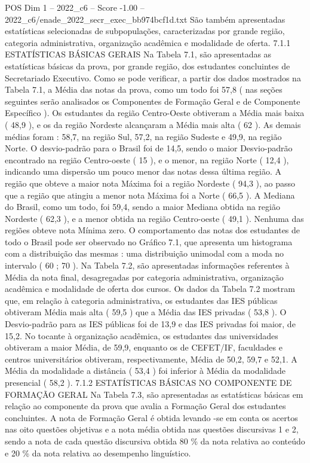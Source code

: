 \begin{textsample}{POS Dim 1 – 2022\_c6 – Score -1.00 – 2022\_c6/enade\_2022\_secr\_exec\_bb974bcf1d.txt}
São também apresentadas estatísticas selecionadas de subpopulações, caracterizadas por grande região, categoria administrativa, organização acadêmica e modalidade de oferta. 7.1.1 ESTATÍSTICAS BÁSICAS GERAIS Na Tabela 7.1, são apresentadas as estatísticas básicas da prova, por grande região, dos estudantes concluintes de Secretariado Executivo.
Como se pode verificar, a partir dos dados mostrados na Tabela 7.1, a Média das notas da prova, como um todo foi 57,8 ( nas seções seguintes serão analisados os Componentes de Formação Geral e de Componente Específico ).
Os estudantes da região Centro-Oeste obtiveram a Média mais baixa ( 48,9 ), e os da região Nordeste alcançaram a Média mais alta ( 62 ).
As demais médias foram : 58,7, na região Sul, 57,2, na região Sudeste e 49,9, na região Norte.
O desvio-padrão para o Brasil foi de 14,5, sendo o maior Desvio-padrão encontrado na região Centro-oeste ( 15 ), e o menor, na região Norte ( 12,4 ), indicando uma dispersão um pouco menor das notas dessa última região.
A região que obteve a maior nota Máxima foi a região Nordeste ( 94,3 ), ao passo que a região que atingiu a menor nota Máxima foi a Norte ( 66,5 ).
A Mediana do Brasil, como um todo, foi 59,4, sendo a maior Mediana obtida na região Nordeste ( 62,3 ), e a menor obtida na região Centro-oeste ( 49,1 ).
Nenhuma das regiões obteve nota Mínima zero.
O comportamento das notas dos estudantes de todo o Brasil pode ser observado no Gráfico 7.1, que apresenta um histograma com a distribuição das mesmas : uma distribuição unimodal com a moda no intervalo ( 60 ; 70 ).
Na Tabela 7.2, são apresentadas informações referentes à Média da nota final, desagregadas por categoria administrativa, organização acadêmica e modalidade de oferta dos cursos.
Os dados da Tabela 7.2 mostram que, em relação à categoria administrativa, os estudantes das IES públicas obtiveram Média mais alta ( 59,5 ) que a Média das IES privadas ( 53,8 ).
O Desvio-padrão para as IES públicas foi de 13,9 e das IES privadas foi maior, de 15,2.
No tocante à organização acadêmica, os estudantes das universidades obtiveram a maior Média, de 59,9, enquanto os de CEFET/IF, faculdades e centros universitários obtiveram, respectivamente, Média de 50,2, 59,7 e 52,1.
A Média da modalidade a distância ( 53,4 ) foi inferior à Média da modalidade presencial ( 58,2 ). 7.1.2 ESTATÍSTICAS BÁSICAS NO COMPONENTE DE FORMAÇÃO GERAL Na Tabela 7.3, são apresentadas as estatísticas básicas em relação ao componente da prova que avalia a Formação Geral dos estudantes concluintes.
A nota de Formação Geral é obtida levando -se em conta os acertos nas oito questões objetivas e a nota média obtida nas questões discursivas 1 e 2, sendo a nota de cada questão discursiva obtida 80 \% da nota relativa ao conteúdo e 20 \% da nota relativa ao desempenho linguístico.

\end{textsample}
